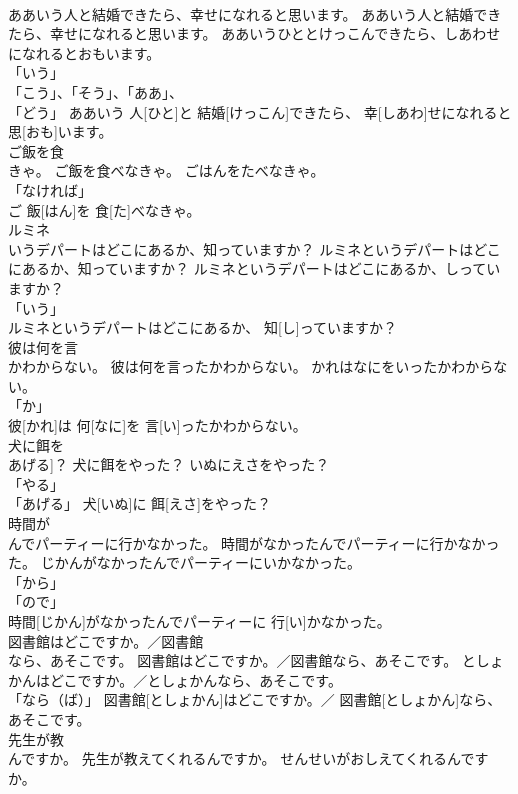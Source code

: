 \documentclass[8pt]{extreport}
\begin{document}
\begin{CJK}{UTF8}{min}
\\	ああいう人と結婚できたら、幸せになれると思います。	ああいう人と結婚できたら、幸せになれると思います。	ああいうひととけっこんできたら、しあわせになれるとおもいます。	
\\	「いう」 
\\	「こう」、「そう」、「ああ」、
\\	「どう」	ああいう 人[ひと]と 結婚[けっこん]できたら、 幸[しあわ]せになれると 思[おも]います。		
\\	ご飯を食
\\	きゃ。	ご飯を食べなきゃ。	ごはんをたべなきゃ。	
\\	「なければ」
\\	ご 飯[はん]を 食[た]べなきゃ。		
\\	ルミネ
\\	いうデパートはどこにあるか、知っていますか？	ルミネというデパートはどこにあるか、知っていますか？	ルミネというデパートはどこにあるか、しっていますか？	
\\	「いう」 
\\	ルミネというデパートはどこにあるか、 知[し]っていますか？		
\\	彼は何を言
\\	かわからない。	彼は何を言ったかわからない。	かれはなにをいったかわからない。	
\\	「か」 
\\	彼[かれ]は 何[なに]を 言[い]ったかわからない。		
\\	犬に餌を
\\	あげる]？	犬に餌をやった？	いぬにえさをやった？	
\\	「やる」 
\\	「あげる」	犬[いぬ]に 餌[えさ]をやった？		
\\	時間が
\\	んでパーティーに行かなかった。	時間がなかったんでパーティーに行かなかった。	じかんがなかったんでパーティーにいかなかった。	
\\	「から」 
\\	「ので」 
\\	時間[じかん]がなかったんでパーティーに 行[い]かなかった。		
\\	図書館はどこですか。／図書館
\\	なら、あそこです。	図書館はどこですか。／図書館なら、あそこです。	としょかんはどこですか。／としょかんなら、あそこです。	
\\	「なら（ば）」	図書館[としょかん]はどこですか。／ 図書館[としょかん]なら、あそこです。		
\\	先生が教
\\	んですか。	先生が教えてくれるんですか。	せんせいがおしえてくれるんですか。	

\end{CJK}
\end{document}
